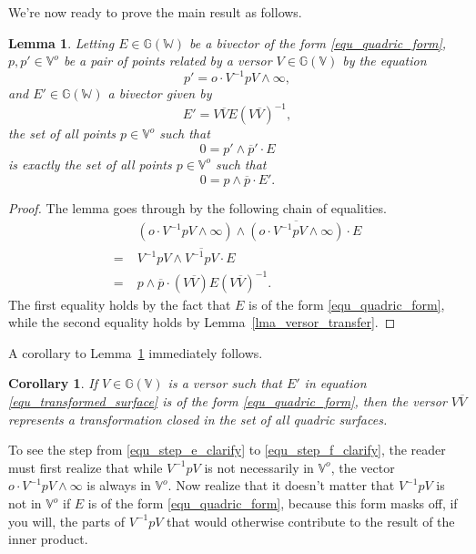 \documentclass{birkjour}
\newtheorem{cor}[thm]{Corollary}
\newtheorem{lem}[thm]{Lemma}
\theoremstyle{definition}
\theoremstyle{remark}
\numberwithin{equation}{section}
\newcommand{\G}{\mathbb{G}}
\newcommand{\V}{\mathbb{V}}
\newcommand{\W}{\mathbb{W}}
\newcommand{\nvao}{o}
\newcommand{\nvai}{\infty}
\begin{document}
We're now ready to prove the main result as follows.
\begin{lem}\label{lma_quadric_transform}
Letting $E\in\G(\W)$ be a bivector of the form \eqref{equ_quadric_form},
$p,p'\in\V^o$ be a pair of points related by a versor $V\in\G(\V)$ by
the equation
\begin{equation}\label{equ_get_rid_ni}
p' = \nvao\cdot V^{-1}pV\wedge\nvai,
\end{equation}
and $E'\in\G(\W)$ a bivector given by
\begin{equation}\label{equ_transformed_surface}
E' = V\overline{V}E(V\overline{V})^{-1},
\end{equation}
the set of all points $p\in\V^\nvao$ such that
\begin{equation}\label{equ_wanted_set}
0 = p'\wedge\overline{p}'\cdot E
\end{equation}
is exactly the set of all points $p\in\V^\nvao$ such that
\begin{equation}\label{equ_derived_set}
0 = p\wedge\overline{p}\cdot E'.
\end{equation}
\end{lem}
\begin{proof}
The lemma goes through by the following chain of equalities.
\begin{align}
 & (\nvao\cdot V^{-1}pV\wedge\nvai)\wedge\overline{(\nvao\cdot V^{-1}pV\wedge\nvai)}\cdot E\label{equ_step_e_clarify} \\
=\;& V^{-1}pV\wedge\overline{V^{-1}pV}\cdot E\label{equ_step_f_clarify} \\
=\;& p\wedge\overline{p}\cdot(V\overline{V})E(V\overline{V})^{-1}.
\end{align}
The first equality holds by the fact that $E$ is of the form \eqref{equ_quadric_form},
while the second equality holds by Lemma~\ref{lma_versor_transfer}.
\end{proof}
A corollary to Lemma~\ref{lma_quadric_transform} immediately follows.
\begin{cor}\label{cor_quadric_transform}
If $V\in\G(\V)$ is a versor such that $E'$ in equation \eqref{equ_transformed_surface}
is of the form \eqref{equ_quadric_form}, then the versor $V\overline{V}$
represents a transformation closed in the set of all quadric surfaces.
\end{cor}

To see the step from \eqref{equ_step_e_clarify} to \eqref{equ_step_f_clarify}, the reader must first realize that
while $V^{-1}pV$ is not necessarily in $\V^o$, the vector
$\nvao\cdot V^{-1}pV\wedge\nvai$ is always in $\V^o$.  Now realize
that it doesn't matter that $V^{-1}pV$ is not in $\V^o$ if $E$
is of the form \eqref{equ_quadric_form}, because this form masks
off, if you will, the parts of $V^{-1}pV$ that would otherwise
contribute to the result of the inner product.
\end{document}
